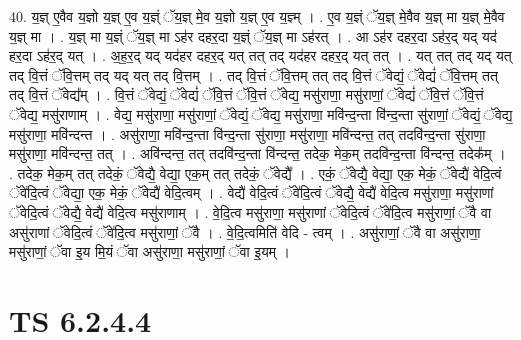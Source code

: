 \documentclass[17pt]{extarticle}
\begin{document}
40. य॒ज्ञ् ए॒वैव य॒ज्ञो य॒ज्ञ् ए॒व य॒ज्ञ्ं ॅय॒ज्ञ् मे॒व य॒ज्ञो य॒ज्ञ् ए॒व य॒ज्ञ्म् । . ए॒व य॒ज्ञ्ं ॅय॒ज्ञ् मे॒वैव य॒ज्ञ् मा य॒ज्ञ् मे॒वैव य॒ज्ञ् मा । . य॒ज्ञ् मा य॒ज्ञ्ं ॅय॒ज्ञ् मा ऽह॑र दहर॒दा य॒ज्ञ्ं ॅय॒ज्ञ् मा ऽह॑रत् । . आ ऽह॑र दहर॒दा ऽह॑र॒द् यद् यद॑ हर॒दा ऽह॑र॒द् यत् । . अ॒ह॒र॒द् यद् यद॑हर दहर॒द् यत् तत् तद् यद॑हर दहर॒द् यत् तत् । . यत् तत् तद् यद् यत् तद् वि॒त्तं ॅवि॒त्तम् तद् यद् यत् तद् वि॒त्तम् । . तद् वि॒त्तं ॅवि॒त्तम् तत् तद् वि॒त्तं ॅवेद्यं॒ ॅवेद्यं॑ ॅवि॒त्तम् तत् तद् वि॒त्तं ॅवेद्य᳚म् । . वि॒त्तं ॅवेद्यं॒ ॅवेद्यं॑ ॅवि॒त्तं ॅवि॒त्तं ॅवेद्य॒ मसु॑राणा॒ मसु॑राणां॒ ॅवेद्यं॑ ॅवि॒त्तं ॅवि॒त्तं ॅवेद्य॒ मसु॑राणाम् । . वेद्य॒ मसु॑राणा॒ मसु॑राणां॒ ॅवेद्यं॒ ॅवेद्य॒ मसु॑राणा॒ मवि॑न्द॒न्ता वि॑न्द॒न्ता सु॑राणां॒ ॅवेद्यं॒ ॅवेद्य॒ मसु॑राणा॒ मवि॑न्दन्त । . असु॑राणा॒ मवि॑न्द॒न्ता वि॑न्द॒न्ता सु॑राणा॒ मसु॑राणा॒ मवि॑न्दन्त॒ तत् तदवि॑न्द॒न्ता सु॑राणा॒ मसु॑राणा॒ मवि॑न्दन्त॒ तत् । . अवि॑न्दन्त॒ तत् तदवि॑न्द॒न्ता वि॑न्दन्त॒ तदेक॒ मेक॒म् तदवि॑न्द॒न्ता वि॑न्दन्त॒ तदेक᳚म् । . तदेक॒ मेक॒म् तत् तदेकं॒ ॅवेद्यै॒ वेद्या॒ एक॒म् तत् तदेकं॒ ॅवेद्यै᳚ । . एकं॒ ॅवेद्यै॒ वेद्या॒ एक॒ मेकं॒ ॅवेद्यै॑ वेदि॒त्वं ॅवे॑दि॒त्वं ॅवेद्या॒ एक॒ मेकं॒ ॅवेद्यै॑ वेदि॒त्वम् । . वेद्यै॑ वेदि॒त्वं ॅवे॑दि॒त्वं ॅवेद्यै॒ वेद्यै॑ वेदि॒त्व मसु॑राणा॒ मसु॑राणां ॅवेदि॒त्वं ॅवेद्यै॒ वेद्यै॑ वेदि॒त्व मसु॑राणाम् । . वे॒दि॒त्व मसु॑राणा॒ मसु॑राणां ॅवेदि॒त्वं ॅवे॑दि॒त्व मसु॑राणां॒ ॅवै वा असु॑राणां ॅवेदि॒त्वं ॅवे॑दि॒त्व मसु॑राणां॒ ॅवै । . वे॒दि॒त्वमिति॑ वेदि - त्वम् । . असु॑राणां॒ ॅवै वा असु॑राणा॒ मसु॑राणां॒ ॅवा इ॒य मि॒यं ॅवा असु॑राणा॒ मसु॑राणां॒ ॅवा इ॒यम् । \newline
\pagebreak
{}

\section{ TS 6.2.4.4 }
\end{document}
